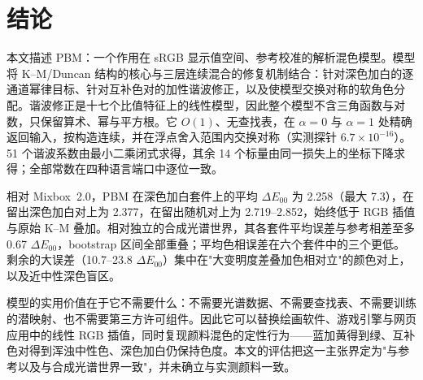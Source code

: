 \section{结论}
\label{sec:conclusion}

本文描述 PBM：一个作用在 sRGB 显示值空间、参考校准的解析混色模型。模型将 K--M/Duncan 结构的核心与三层连续混合的修复机制结合：针对深色加白的逐通道幂律目标、针对互补色对的加性谐波修正，以及使模型交换对称的软角色分配。谐波修正是十七个比值特征上的线性模型，因此整个模型不含三角函数与对数，只保留算术、幂与平方根。它 $O(1)$、无查找表，在 $\alpha=0$ 与 $\alpha=1$ 处精确返回输入，按构造连续，并在浮点舍入范围内交换对称（实测探针 $6.7\times10^{-16}$）。51 个谐波系数由最小二乘闭式求得，其余 14 个标量由同一损失上的坐标下降求得；全部常数在四种语言端口中逐位一致。

相对 Mixbox~2.0，PBM 在深色加白套件上的平均 $\Delta E_{00}$ 为 2.258（最大 7.3），在留出深色加白对上为 2.377，在留出随机对上为 2.719--2.852，始终低于 RGB 插值与原始 K--M 叠加。相对独立的合成光谱世界，其各套件平均误差与参考相差至多 0.67 $\Delta E_{00}$，bootstrap 区间全部重叠；平均色相误差在六个套件中的三个更低。剩余的大误差（10.7--23.8 $\Delta E_{00}$）集中在"大变明度差叠加色相对立"的颜色对上，以及近中性深色盲区。

模型的实用价值在于它不需要什么：不需要光谱数据、不需要查找表、不需要训练的潜映射、也不需要第三方许可组件。因此它可以替换绘画软件、游戏引擎与网页应用中的线性 RGB 插值，同时复现颜料混色的定性行为——蓝加黄得到绿、互补色对得到浑浊中性色、深色加白仍保持色度。本文的评估把这一主张界定为"与参考以及与合成光谱世界一致"，并未确立与实测颜料一致。
